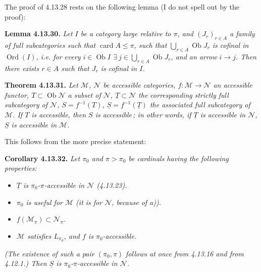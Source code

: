 \documentclass[11pt]{article}
\newcommand{\printedpage}[1]{\marginpar{\footnotesize p.~#1}}
\newcommand{\msp}[1]{\marginpar{\footnotesize [#1]}}
\newcommand{\Ob}{\operatorname{Ob}}
\newcommand{\Ord}{\operatorname{Ord}}
\newcommand{\card}{\operatorname{card}}
\begin{document}
The proof of 4.13.28 rests on the following lemma (I do not spell out by the proof): %

\printedpage{133}
\msp{page 350}
\textbf{Lemma 4.13.30.} \textit{Let $I$ be a category large relative to $\pi$, and $(J_r)_{r\in A}$ a family of full subcategories such that $\card A\leqslant\pi$, such that $\bigcup_{r\in A}\Ob J_r$ is cofinal in $\Ord(I)$, i.e. for every $i\in\Ob I$ $\exists\ j\in\bigcup_{r\in A}\Ob J_r$, and an arrow $i\longrightarrow j$. Then there exists $r\in A$ such that $J_r$ is cofinal in $I$.}

\textbf{Theorem 4.13.31.} \textit{Let $\mathcal{M}$, $\mathcal{N}$ be accessible categories, $f:\mathcal{M}\longrightarrow\mathcal{N}$ an accessible functor, $T\subset\Ob\mathcal{N}$ a subset of $\mathcal{N}$, $\underline{T}\subset\mathcal{N}$ the corresponding strictly full subcategory of $\mathcal{N}$, $S=f^{-1}(T)$, $\underline{S}=f^{-1}(\underline{T})$ the associated full subcategory of $\mathcal{M}$. If $T$ is accessible, then $S$ is accessible\,; in other words, if $\underline{T}$ is accessible in $\mathcal{N}$, $\underline{S}$ is accessible in $\mathcal{M}$.}

This follows from the more precise statement:

\textbf{Corollary 4.13.32.} \textit{Let $\pi_0$ and $\pi>\pi_0$ be cardinals having the following properties:}

\msp{page 351}
\begin{itemize}[leftmargin=2.5em]
\item[\textit{a)}] \textit{$\underline{T}$ is $\pi_0$-$\pi$-accessible in $\mathcal{N}$ (4.13.23).}
\item[\textit{b)}] \textit{$\pi_0$ is useful for $\mathcal{M}$ (it is for $\mathcal{N}$, because of a)).}
\item[\textit{c)}] \textit{$f(\mathcal{M}_\pi)\subset\mathcal{N}_\pi$.}
\item[\textit{d)}] \textit{$\mathcal{M}$ satisfies $L_{\pi_0}$, and $f$ is $\pi_0$-accessible.}
\end{itemize}
\textit{(The existence of such a pair $(\pi_0,\pi)$ follows at once from 4.13.16 and from 4.12.1.) Then $\underline{S}$ is $\pi_0$-$\pi$-accessible in $\mathcal{N}$.}
\end{document}
